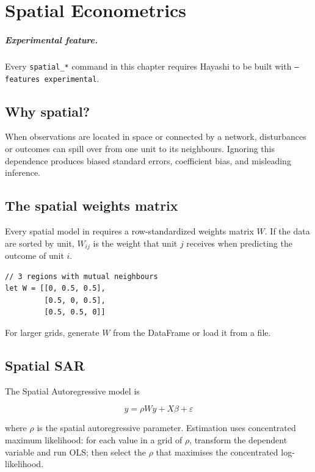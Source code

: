 \chapter{Spatial Econometrics}

\paragraph*{Experimental feature.} Every \texttt{spatial\_*} command in this
chapter requires Hayashi to be built with \texttt{--features experimental}.

\section{Why spatial?}

When observations are located in space or connected by a network,
disturbances or outcomes can spill over from one unit to its
neighbours. Ignoring this dependence produces biased standard errors,
coefficient bias, and misleading inference.

\section{The spatial weights matrix}

Every spatial model in \hayashi{} requires a row-standardized weights
matrix $W$. If the data are sorted by unit, $W_{ij}$ is the weight that
unit $j$ receives when predicting the outcome of unit $i$.

\begin{lstlisting}[caption={Spatial weights matrix}]
// 3 regions with mutual neighbours
let W = [[0, 0.5, 0.5],
         [0.5, 0, 0.5],
         [0.5, 0.5, 0]]
\end{lstlisting}

For larger grids, generate $W$ from the DataFrame or load it from a file.

\section{Spatial SAR}

The Spatial Autoregressive model is

\[
y = \rho W y + X\beta + \varepsilon
\]

where $\rho$ is the spatial autoregressive parameter. Estimation uses
concentrated maximum likelihood: for each value in a grid of $\rho$,
transform the dependent variable and run OLS; then select the $\rho$
that maximises the concentrated log-likelihood.

